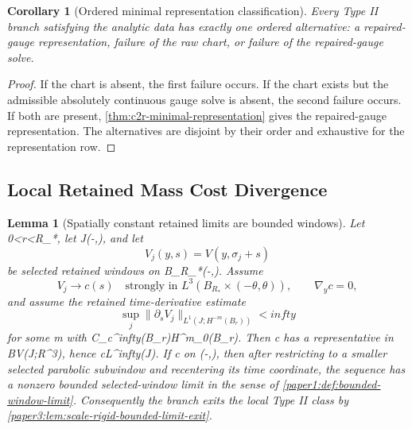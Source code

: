 \documentclass[11pt]{amsart}
\def\({}%
\def\){}%
\def\mathbb#1{#1}%
\def\infty{infty}%
\theoremstyle{plain}
\newtheorem{lemma}[lemma]{Lemma}
\newtheorem{corollary}[corollary]{Corollary}
\theoremstyle{definition}
\theoremstyle{remark}
\begin{document}
\begin{corollary}[Ordered minimal representation classification]
\label{cor:c2r-ordered-classification}
Every Type II branch satisfying the analytic data has exactly one ordered
alternative: a repaired-gauge representation, failure of the raw chart, or
failure of the repaired-gauge solve.
\end{corollary}

\begin{proof}
If the chart is absent, the first failure occurs.  If the chart exists but the
admissible absolutely continuous gauge solve is absent, the second failure
occurs.  If both are present, \cref{thm:c2r-minimal-representation} gives the
repaired-gauge representation.  The alternatives are disjoint by their order
and exhaustive for the representation row.
\end{proof}

\subsection{Local Retained Mass Cost Divergence}

\begin{lemma}[Spatially constant retained limits are bounded windows]
\label{lem:c3-spatially-constant-retained-limit-bounded}
Let \(0<r<R_*\), let \(J\Subset(-\theta,\theta)\), and let
\[
  V_j(y,s)=V(y,\sigma_j+s)
\]
be selected retained windows on \(B_{R_*}\times(-\theta,\theta)\).  Assume
\[
  V_j\to c(s)
  \quad\text{strongly in }L^3(B_{R_*}\times(-\theta,\theta)),
  \qquad
  \nabla_y c=0,
\]
and assume the retained time-derivative estimate
\[
  \sup_j\|\partial_s V_j\|_{L^1(J;H^{-m}(B_r))}<\infty
\]
for some \(m\) with \(C_c^\infty(B_r)\subset H^m_0(B_r)\).  Then \(c\) has a
representative in \(BV(J;\mathbb R^3)\), hence \(c\in L^\infty(J)\).  If
\(c\not{}\) on \((-\theta,\theta)\), then after restricting to a smaller
selected parabolic subwindow and recentering its time coordinate, the sequence
has a nonzero bounded selected-window limit in the sense of
\cref{paper1:def:bounded-window-limit}.  Consequently the branch exits the
local Type II class by \cref{paper3:lem:scale-rigid-bounded-limit-exit}.
\end{lemma}
\end{document}
